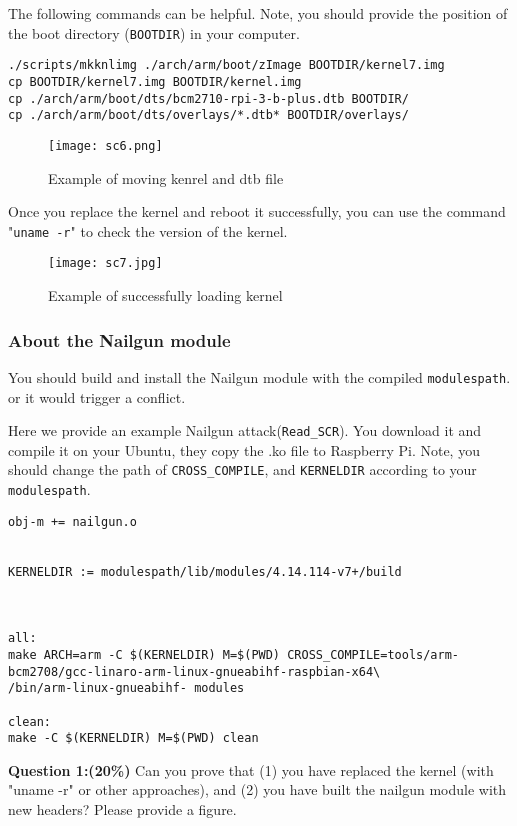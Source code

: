 The following commands can be helpful. Note, you should provide the 
position of the boot directory (\texttt{BOOTDIR}) in your computer.

\begin{lstlisting}
./scripts/mkknlimg ./arch/arm/boot/zImage BOOTDIR/kernel7.img
cp BOOTDIR/kernel7.img BOOTDIR/kernel.img
cp ./arch/arm/boot/dts/bcm2710-rpi-3-b-plus.dtb BOOTDIR/
cp ./arch/arm/boot/dts/overlays/*.dtb* BOOTDIR/overlays/
\end{lstlisting}

\begin{figure}[H]
	\centering
	\texttt{[image: sc6.png]}
	\caption{Example of moving kenrel and dtb file}
\end{figure}


Once you replace the kernel and reboot it successfully, you can use the command "\texttt{uname -r}" to check the version of the kernel.

\begin{figure}[H]
	\centering
	\texttt{[image: sc7.jpg]}
	\caption{Example of successfully loading kernel}
\end{figure}



\subsubsection{About the Nailgun module}
You should build and install the Nailgun module with the compiled 
\texttt{modulespath}. or it would trigger a conflict.

Here we provide an example Nailgun attack(\texttt{Read\_SCR}). You 
download it 
and compile it on your Ubuntu, they copy the .ko file to Raspberry Pi.
Note, you should change the path of \texttt{CROSS\_COMPILE}, and 
\texttt{KERNELDIR} according to your \texttt{modulespath}.


\begin{lstlisting}
obj-m += nailgun.o


KERNELDIR := modulespath/lib/modules/4.14.114-v7+/build



all:
make ARCH=arm -C $(KERNELDIR) M=$(PWD) CROSS_COMPILE=tools/arm-bcm2708/gcc-linaro-arm-linux-gnueabihf-raspbian-x64\
/bin/arm-linux-gnueabihf- modules

clean:
make -C $(KERNELDIR) M=$(PWD) clean
\end{lstlisting}

\textbf{Question 1:(\textbf{20\%})} Can you prove that (1) you have 
replaced the 
kernel (with "uname -r" or other approaches), and (2) you have built 
the nailgun module with new headers? Please provide a figure. 


